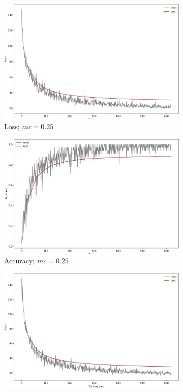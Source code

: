 \begin{figure}[]
\begin{subfigure}[b]{0.48\textwidth}
         \includegraphics[width=\textwidth]{observational/img/bnn/mc/LC_mc0.25.png}
         \caption{Loss; $mc=0.25$}
     \end{subfigure}
     \hfill
     \begin{subfigure}[b]{0.48\textwidth}
         \centering
         \includegraphics[width=\textwidth]{observational/img/bnn/mc/AC_mc0.25.png}
         \caption{Accuracy; $mc=0.25$}
     \end{subfigure} 
     \par\bigskip
     \begin{subfigure}[b]{0.48\textwidth}
         \centering
         \includegraphics[width=\textwidth]{observational/img/bnn/mc/LC_default.png}

\end{subfigure}
\end{figure}
